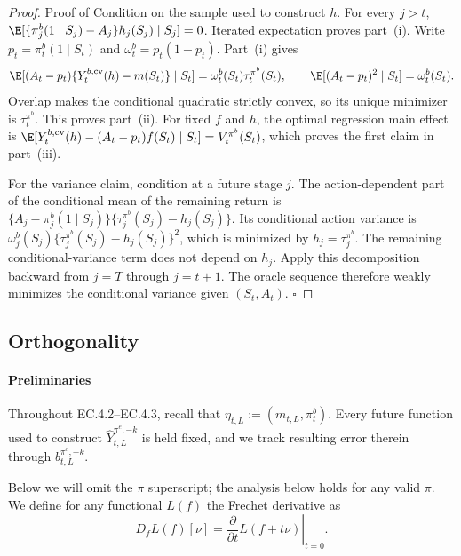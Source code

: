 \documentclass[opre,nonblindrev]{informs4}
\newcommand{\az}[1]{{\color{purple} [\textbf{az:}~#1]}}
\newcommand{\blipadv}{\tau}
\renewcommand{\qed}{\unskip\nobreak\hfill\ensuremath{\square}}
\begin{document}
\begin{proof}{Proof of }
Condition on the sample used to construct $h$.  For every $j>t$,
$\E[\{\pi_j^b(1\mid S_j)-A_j\}h_j(S_j)\mid S_j]=0$.
Iterated expectation proves part~\textup{(i)}.  Write
$p_t=\pi_t^b(1\mid S_t)$ and
$\omega_t^b=p_t(1-p_t)$.  Part~\textup{(i)} gives
\[
\E[(A_t-p_t)\{Y_t^{b,\mathrm{cv}}(h)-m(S_t)\}\mid S_t]
=\omega_t^b(S_t)\blipadv_t^{\pi^b}(S_t),
\qquad \E[(A_t-p_t)^2\mid S_t]=\omega_t^b(S_t).
\]
Overlap makes the conditional quadratic strictly convex, so its unique
minimizer is $\blipadv_t^{\pi^b}$.  This proves part~\textup{(ii)}.
For fixed $f$ and $h$, the optimal regression main effect is
$
\E[Y_t^{b,\mathrm{cv}}(h)-(A_t-p_t)f(S_t)\mid S_t]
=V_t^{\pi^b}(S_t)$,
which proves the first claim in part~\textup{(iii)}.

For the variance claim, condition at a future stage $j$.  The
action-dependent part of the conditional mean of the remaining return is
$
\{A_j-\pi_j^b(1\mid S_j)\}
\{\blipadv_j^{\pi^b}(S_j)-h_j(S_j)\}$.
Its conditional action variance is
$
\omega_j^b(S_j)
\{\blipadv_j^{\pi^b}(S_j)-h_j(S_j)\}^2$,
which is minimized by $h_j=\blipadv_j^{\pi^b}$.  The remaining
conditional-variance term does not depend on $h_j$.  Apply this decomposition
backward from $j=T$ through $j=t+1$.  The oracle sequence therefore weakly
minimizes the conditional variance given $(S_t,A_t)$. \qed
\end{proof}









\subsection{Orthogonality}\label{apx-orthogonality}
\paragraph{Preliminaries}
Throughout EC.4.2--EC.4.3, recall that
$\eta_{t,L}:=(m_{t,L},\pi_t^b)$.
Every future function used to construct
$\hat Y_{t,L}^{\pi^e,-k}$ is held fixed, and we track resulting error therein through $b_{t,L}^{\pi^e,-k}$.

Below we will omit the $\pi$ superscript; the analysis below holds for any valid $\pi$.
We define for any functional $L(f)$ the Frechet derivative as
\[
D_f L(f)[\nu]=\left.\frac{\partial}{\partial t} L(f+t \nu)\right|_{t=0}.
\]
\end{document}
